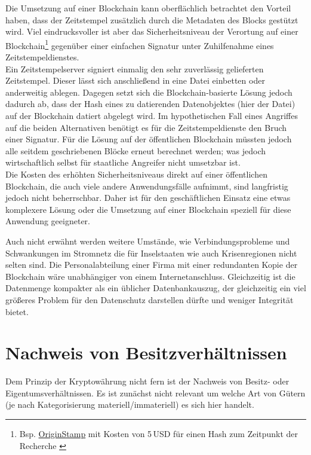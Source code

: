 Die Umsetzung auf einer Blockchain kann oberflächlich betrachtet den Vorteil haben, dass der Zeitstempel zusätzlich durch die Metadaten des Blocks gestützt wird. Viel eindrucksvoller ist aber das Sicherheitsniveau der Verortung auf einer Blockchain\footnote{Bsp. \href{https://app.originstamp.org/}{OriginStamp} mit Kosten von 5\,USD für einen Hash zum Zeitpunkt der Recherche \autocite{w:originstamp}} gegenüber einer einfachen Signatur unter Zuhilfenahme eines Zeitstempeldienstes. \\
Ein Zeitstempelserver signiert einmalig den sehr zuverlässig gelieferten Zeitstempel. Dieser lässt sich anschließend in \zB{} eine Datei einbetten oder anderweitig ablegen. Dagegen setzt sich die Blockchain-basierte Lösung jedoch dadurch ab, dass der Hash eines zu datierenden Datenobjektes (hier der Datei) auf der Blockchain datiert abgelegt wird. Im hypothetischen Fall eines Angriffes auf die beiden Alternativen benötigt es für die Zeitstempeldienste den Bruch einer Signatur. Für die Lösung auf der öffentlichen Blockchain müssten jedoch alle seitdem geschriebenen Blöcke erneut berechnet werden; was jedoch wirtschaftlich selbst für staatliche Angreifer nicht umsetzbar ist. \\
Die Kosten des erhöhten Sicherheitsniveaus direkt auf einer öffentlichen Blockchain, die auch viele andere Anwendungsfälle aufnimmt, sind langfristig jedoch nicht beherrschbar. Daher ist für den geschäftlichen Einsatz eine etwas komplexere Lösung oder die Umsetzung auf einer Blockchain speziell für diese Anwendung geeigneter.

Auch nicht erwähnt werden weitere Umstände, wie Verbindungsprobleme und Schwankungen im Stromnetz die für Inselstaaten wie auch Krisenregionen nicht selten sind. Die Personalabteilung einer Firma mit einer redundanten Kopie der Blockchain wäre unabhängiger von einem Internetanschluss. Gleichzeitig ist die Datenmenge kompakter als ein üblicher Datenbankauszug, der gleichzeitig ein viel größeres Problem für den Datenschutz darstellen dürfte und weniger Integrität bietet.

\section{Nachweis von Besitzverhältnissen}\label{uc:owning}

Dem Prinzip der Kryptowährung nicht fern ist der Nachweis von Besitz- oder Eigentumsverhältnissen. Es ist zunächst nicht relevant um welche Art von Gütern (je nach Kategorisierung \zB{} materiell/immateriell) es sich hier handelt.

